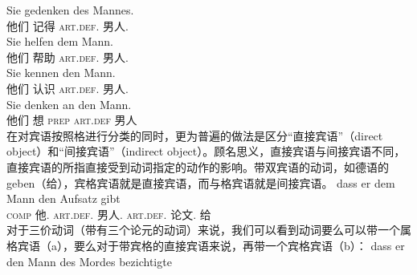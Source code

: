 \eal
\ex 
\gll Sie gedenken des Mannes.\\
	 他们 记得 \textsc{art}.\textsc{def}.\gen{} 男人.\gen{}\\
\ex 
\gll Sie helfen dem Mann.\\
	 他们 帮助 \textsc{art}.\textsc{def}.\dat{} 男人.\dat{}\\
\ex 
\gll Sie kennen den Mann.\\
	 他们 认识 \textsc{art}.\textsc{def}.\acc{} 男人.\acc{}\\
\ex 
\gll Sie denken an den Mann.\\
	 他们 想 \textsc{prep} \textsc{art}.\textsc{def} 男人\\
\zl
在对宾语按照格进行分类的同时，更为普遍的做法是区分“直接宾语”（direct object）和“间接宾语”（indirect object）。顾名思义，直接宾语与间接宾语不同，直接宾语的所指直接受到动词指定的动作的影响。带双宾语的动词，如德语的geben（给），宾格宾语就是直接宾语，而与格宾语就是间接宾语。
\ea
\gll dass er dem Mann den Aufsatz gibt\\
	 \textsc{comp} 他.\nom{} \textsc{art}.\textsc{def}.\dat{} 男人.\dat{} \textsc{art}.\textsc{def}.\acc{} 论文.\acc{} 给\\
\z
对于三价动词（带有三个论元的动词）来说，我们可以看到动词要么可以带一个属格宾语（a），要么对于带宾格的直接宾语来说，再带一个宾格宾语（b）：
\eal
\ex 
\gll dass er den Mann des Mordes bezichtigte\\
